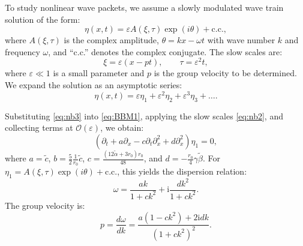 \documentclass[alpha-refs, 12pt]{wiley-article}
\renewcommand{\O}{\mathcal{O}}
\newcommand{\ui}{\mathrm{i}}
\newcommand{\eps}{\varepsilon}
\begin{document}
To study nonlinear wave packets, we assume a slowly modulated wave train solution of the form:
\begin{equation}\label{eq:nb1}
  \eta(x,t) = \eps A(\xi, \tau) \exp(i \theta) + \text{c.c.},
\end{equation}
where $A(\xi, \tau)$ is the complex amplitude, $\theta = k x - \omega t$ with wave number $k$ and frequency $\omega$, and ``c.c.'' denotes the complex conjugate. The slow scales are:
\begin{equation}\label{eq:nb2}
  \xi = \eps (x - p t), \qquad \tau = \eps^2 t,
\end{equation}
where $\eps \ll 1$ is a small parameter and $p$ is the group velocity to be determined. We expand the solution as an asymptotic series:
\begin{equation}\label{eq:nb3}
  \eta(x,t) = \eps \eta_1 + \eps^2 \eta_2 + \eps^3 \eta_3 + \dots.
\end{equation}

Substituting \eqref{eq:nb3} into \eqref{eq:BBM1}, applying the slow scales \eqref{eq:nb2}, and collecting terms at $\O(\eps)$, we obtain:
\begin{equation}\label{eq:first_order}
  \left(\partial_t + a \partial_x - c \partial_t \partial_x^2 + d \partial_x^2 \right)\eta_1 = 0,
\end{equation}
where $a = \tilde{c}$, $b = \frac{5}{2} \frac{1}{r_0} \tilde{c}$, $c = \frac{(12 \tilde{\alpha} + 3 r_0) r_0}{48}$, and $d = -\frac{r_0}{4} \gamma \tilde{\beta}$. For $\eta_1 = A(\xi, \tau) \exp(i \theta) + \text{c.c.}$, this yields the dispersion relation:
\begin{equation}\label{eq:dispersion_bbm_a}
  \omega = \frac{a k}{1 + c k^2} + \ui \frac{d k^2}{1 + c k^2}.
\end{equation}
The group velocity is:
\[
  p = \frac{d \omega}{d k} = \frac{a (1 - c k^2) + 2 \ui d k}{(1 + c k^2)^2}.
\]
\end{document}
